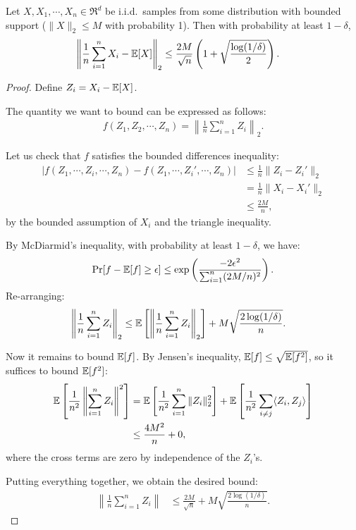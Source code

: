 \begin{lemma}
  \label{lem:conc-norms}
  Let $X, X_1, \cdots, X_n \in \Re^d$ be i.i.d.\ samples
  from some distribution with bounded support
  ($\|X\|_2 \le M$ with probability 1).
  Then with probability at least $1 - \delta$,
  \begin{align*}
    \left\| \frac{1}{n} \sum_{i=1}^{n} X_i - \operatorname{\mathbb{E}}[X] \right\|_2 &
    \le \frac{2M}{\sqrt{n}} \left(1 + \sqrt{\frac{\log(1/\delta)}{2}}\right).
  \end{align*}
\end{lemma}
\begin{proof}
  Define $Z_i = X_i - \operatorname{\mathbb{E}}[X]$.


The quantity we want to bound can be expressed as follows:
  \begin{align*}
  f(Z_1, Z_2, \cdots, Z_n) = \left\| \frac1n \sum_{i=1}^n Z_i \right\|_2.
  \end{align*}

Let us check that $f$ satisfies the bounded differences inequality:
  \begin{align*}
|f(Z_1, \cdots, Z_i, \cdots, Z_n) - f(Z_1, \cdots, Z_i', \cdots, Z_n)|
& \le \frac1n \|Z_i - Z_i'\|_2 \\
& = \frac1n \|X_i - X_i'\|_2 \\
&\le \frac{2M}{n},
  \end{align*}
  by the bounded assumption of $X_i$ and the triangle inequality.

By McDiarmid's inequality,
with probability at least $1 - \delta$,
we have:
\begin{align*}
\Pr[f - \operatorname{\mathbb{E}}[f] \ge \epsilon] \le
\exp\left(\frac{-2 \epsilon^2}{\sum_{i=1}^n (2M/n)^2}\right).
\end{align*}
Re-arranging:
\begin{align*}
  \left\|\frac{1}{n}\sum_{i=1}^n Z_i\right\|_2
  &\le \operatorname{\mathbb{E}}\left[ \left\| \frac{1}{n} \sum_{i=1}^n Z_i \right\|_2 \right]
  + M\sqrt{\frac{2\log(1/\delta)}{n}}.
\end{align*}

Now it remains to bound $\operatorname{\mathbb{E}}[f]$.
By Jensen's inequality, $\operatorname{\mathbb{E}}[f] \le \sqrt{\operatorname{\mathbb{E}}[f^2]}$,
so it suffices to bound $\operatorname{\mathbb{E}}[f^2]$:
\begin{align*}
  \operatorname{\mathbb{E}}\left[ \frac1{n^2} \left\| \sum_{i=1}^n Z_i \right\|^2 \right]
  &= \operatorname{\mathbb{E}}\left[ \frac1{n^2} \sum_{i=1}^n \|Z_i\|_2^2 \right] +
\operatorname{\mathbb{E}}\left[ \frac1{n^2} \sum_{i\neq j} \langle Z_i, Z_j \rangle \right] \\ 
& \le \frac{4M^2}{n} + 0,
\end{align*}
where the cross terms are zero by independence of the $Z_i$'s.

Putting everything together, we obtain the desired bound:
\begin{align*}
\left\|\frac{1}{n}\sum_{i=1}^n Z_i \right\|
&\le \frac{2M}{\sqrt{n}} + M \sqrt{\frac{2\log(1/\delta)}{n}}.
\end{align*}
\end{proof}

